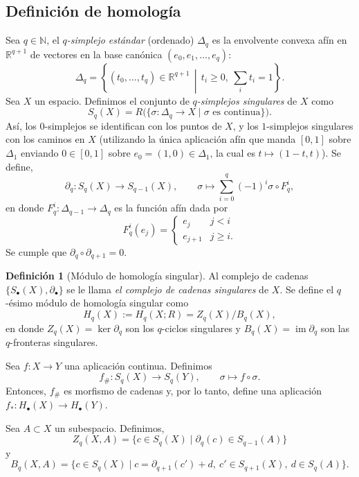 \documentclass[11pt,a4paper]{article}
\theoremstyle{plain}
\theoremstyle{definition}
\newtheorem{definition}[theorem]{Definición}
\theoremstyle{remark}
\newcommand{\RR}{\mathbb R}
\newcommand{\NN}{\mathbb N}
\DeclareMathOperator{\im}{im}
\begin{document}
\subsection{Definición de homología}

Sea $q\in\NN$, el \emph{$q$-simplejo estándar} (ordenado) $\Delta_q$ es la
envolvente convexa afín en $\RR^{q+1}$ de vectores en la base canónica
$(e_0,e_1,\dots,e_q)$:
\[
\Delta_q=\left\{(t_0,\dots,t_q)\in\RR^{q+1} \,\middle|\, t_i\ge0,\ \sum_it_i=1\right\}.
\]
Sea $X$ un espacio. Definimos el conjunto de \emph{$q$-simplejos singulares}
de $X$ como
\[
S_q(X)=R\big(\{\sigma:\Delta_q\to X\mid\sigma\text{ es continua}\}\big).
\]
Así, los $0$-simplejos se identifican con los puntos de $X$, y los
$1$-simplejos singulares con los caminos en $X$ (utilizando la única
aplicación afín que manda $[0,1]$ sobre $\Delta_1$ enviando $0\in[0,1]$
sobre $e_0=(1,0)\in\Delta_1$, la cual es $t\mapsto(1-t,t)$). Se define,
\[
\partial_q:S_q(X)\to S_{q-1}(X), \qquad \sigma\mapsto\sum_{i=0}^q(-1)^i\sigma\circ F_q^i,
\]
en donde $F_q^i:\Delta_{q-1}\to\Delta_q$ es la función afín dada por
\[
F_q^i(e_j)=\begin{cases}e_j & j<i\\ e_{j+1} & j\ge i.\end{cases}
\]
Se cumple que $\partial_q\circ\partial_{q+1}=0$.

\begin{definition}[Módulo de homología singular]
\label{def:homologia-singular}
Al complejo de cadenas $\{S_\bullet(X),\partial_\bullet\}$ se le llama
\emph{el complejo de cadenas singulares} de $X$. Se define el $q$-ésimo
módulo de homología singular como
\[
H_q(X):=H_q(X;R)=Z_q(X)/B_q(X),
\]
en donde $Z_q(X)=\ker\partial_q$ son los $q$-ciclos singulares y
$B_q(X)=\im\partial_q$ son las $q$-fronteras singulares.

Sea $f:X\to Y$ una aplicación continua. Definimos
\[
f_\#:S_q(X)\to S_q(Y), \qquad \sigma\mapsto f\circ\sigma.
\]
Entonces, $f_\#$ es morfismo de cadenas y, por lo tanto, define una
aplicación $f_*:H_\bullet(X)\to H_\bullet(Y)$.

Sea $A\subset X$ un subespacio. Definimos,
\[
Z_q(X,A)=\{c\in S_q(X)\mid\partial_q(c)\in S_{q-1}(A)\}
\]
y
\[
B_q(X,A)=\{c\in S_q(X)\mid c=\partial_{q+1}(c')+d,\ c'\in S_{q+1}(X),\ d\in S_q(A)\}.
\]
\end{definition}
\end{document}
